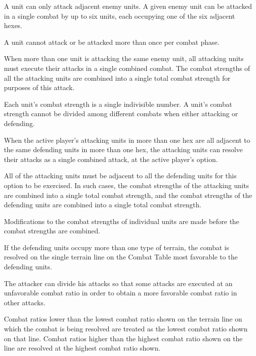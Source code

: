  A unit can only attack adjacent enemy units. A given enemy unit can be attacked in a single combat by up to six units, each occupying one of the six adjacent hexes.

 A unit cannot attack or be attacked more than once per combat phase.

When more than one unit is attacking the same enemy unit, all attacking units must execute their attacks in a single combined combat. The combat strengths of all the attacking units are combined into a single total combat strength for purposes of this attack.

 Each unit's combat strength is a single indivisible number. A unit's combat strength cannot be divided among different combats when either attacking or defending.

 When the active player's attacking units in more than one hex are all adjacent to the same defending units in more than one hex, the attacking units can resolve their attacks as a single combined attack, at the active player's option.

All of the attacking units must be adjacent to all the defending units for this option to be exercised. In such cases, the combat strengths of the attacking units are combined into a single total combat strength, and the combat strengths of the defending units are combined into a single total combat strength.

 Modifications to the combat strengths of individual units are made before the combat strengths are combined.

If the defending units occupy more than one type of terrain, the combat is resolved on the single terrain line on the Combat Table most favorable to the defending units.

 The attacker can divide his attacks so that some attacks are executed at an unfavorable combat ratio in order to obtain a more favorable combat ratio in other attacks.

Combat ratios lower than the lowest combat ratio shown on the terrain line on which the combat is being resolved are treated as the lowest combat ratio shown on that line. Combat ratios higher than the highest combat ratio shown on the line are resolved at the highest combat ratio shown.
